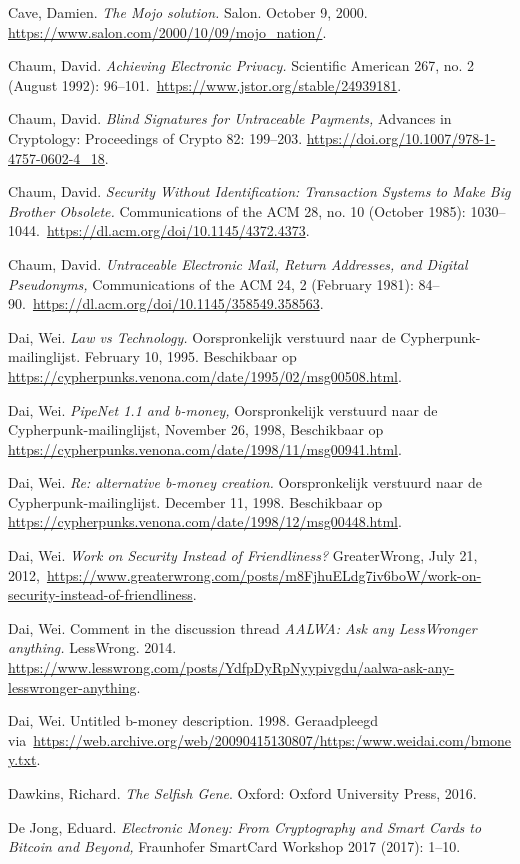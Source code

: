 \documentclass[
  a5paper,
  smalldemyvopaper,11pt,twoside,onecolumn,openright,extrafontsizes,
hidelinks]{memoir}
\begin{document}
{Cave, Damien. \emph{The Mojo solution.} Salon. October 9, 2000.
\url{https://www.salon.com/2000/10/09/mojo_nation/}.

Chaum, David. \emph{Achieving Electronic Privacy.} Scientific American
267, no. 2 (August 1992):
96--101.~\url{https://www.jstor.org/stable/24939181}.

Chaum, David. \emph{Blind Signatures for Untraceable Payments,} Advances
in Cryptology: Proceedings of Crypto 82: 199--203.
\url{https://doi.org/10.1007/978-1-4757-0602-4_18}.

Chaum, David. \emph{Security Without Identification: Transaction Systems
to Make Big Brother Obsolete.} Communications of the ACM 28, no. 10
(October 1985):
1030--1044.~\url{https://dl.acm.org/doi/10.1145/4372.4373}.

Chaum, David. \emph{Untraceable Electronic Mail, Return Addresses, and
Digital Pseudonyms,} Communications of the ACM 24, 2 (February 1981):
84--90.~\url{https://dl.acm.org/doi/10.1145/358549.358563}.

Dai, Wei. \emph{Law vs Technology.} Oorspronkelijk verstuurd naar de
Cypherpunk-mailinglijst. February 10, 1995. Beschikbaar op
\url{https://cypherpunks.venona.com/date/1995/02/msg00508.html}.

Dai, Wei. \emph{PipeNet 1.1 and b-money,} Oorspronkelijk verstuurd naar
de Cypherpunk-mailinglijst, November 26, 1998, Beschikbaar op
\url{https://cypherpunks.venona.com/date/1998/11/msg00941.html}.

Dai, Wei. \emph{Re: alternative b-money creation.} Oorspronkelijk
verstuurd naar de Cypherpunk-mailinglijst. December 11, 1998.
Beschikbaar op
\url{https://cypherpunks.venona.com/date/1998/12/msg00448.html}.

Dai, Wei. \emph{Work on Security Instead of Friendliness?} GreaterWrong,
July 21,
2012,~\url{https://www.greaterwrong.com/posts/m8FjhuELdg7iv6boW/work-on-security-instead-of-friendliness}.

Dai, Wei. Comment in the discussion thread \emph{AALWA: Ask any
LessWronger anything.} LessWrong. 2014.
\url{https://www.lesswrong.com/posts/YdfpDyRpNyypivgdu/aalwa-ask-any-lesswronger-anything}.

Dai, Wei. Untitled b-money description. 1998. Geraadpleegd
via~\url{https://web.archive.org/web/20090415130807/https:/www.weidai.com/bmoney.txt}.

Dawkins, Richard. \emph{The Selfish Gene}. Oxford: Oxford University
Press, 2016.

De Jong, Eduard. \emph{Electronic Money: From Cryptography and Smart
Cards to Bitcoin and Beyond,} Fraunhofer SmartCard Workshop 2017 (2017):
1--10.

}
\end{document}
